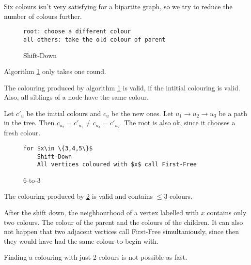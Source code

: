 Six colours isn't very satisfying for a bipartite graph, so we try to reduce the number of colours further.

\begin{figure}[hbt]
\begin{lstlisting}
root: choose a different colour
all others: take the old colour of parent
\end{lstlisting}
\caption{Shift-Down}
\label{alg:Shift-Down}
\end{figure}

Algorithm \ref{alg:Shift-Down} only takes one round.

\begin{lem} The colouring produced by algorithm \ref{alg:Shift-Down} is valid, if the intitial colouring is valid. Also, all siblings of a node have the same colour.\end{lem}

\begin{pr} Let $c'_u$ be the initial colours and $c_u$ be the new ones. Let $u_1\rightarrow u_2 \rightarrow u_3$ be a path in the tree. Then $c_{u_2}=c'_{u_1} \neq c_{u_3}=c'_{u_2}$. The root is also ok, since it chooses a fresh colour.\end{pr}

\begin{figure}[hbt]
\begin{lstlisting}
for $x\in \{3,4,5\}$
	Shift-Down
	All vertices coloured with $x$ call First-Free
\end{lstlisting}
\caption{6-to-3}
\label{alg:6-to-3}
\end{figure}

\begin{lem} The colouring produced by \ref{alg:6-to-3} is valid and contains $\leq 3$ colours.\end{lem}

\begin{pr} After the shift down, the neighbourhood of a vertex labelled with $x$ contains only two colours. The colour of the parent and the colours of the children. It can also not happen that two adjacent vertices call First-Free simultaniously, since then they would have had the same colour to begin with.\end{pr}

Finding a colouring with just 2 colours is not possible as fast.